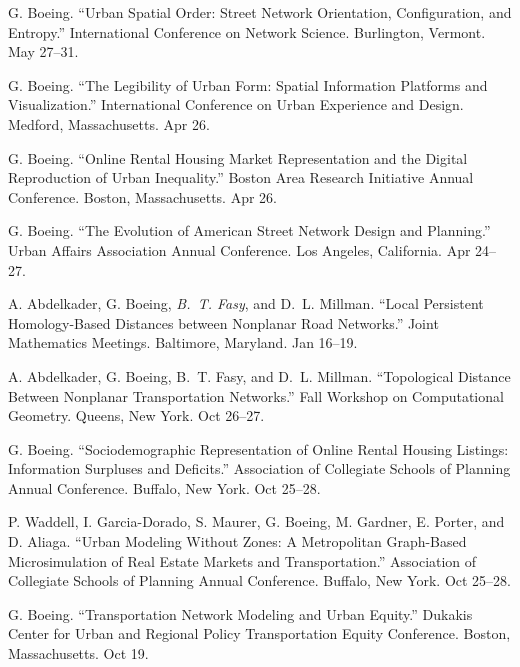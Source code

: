 \documentclass[11pt,letterpaper]{report} %
\begin{document}
\begin{tablist}
\item[2019] \tab{}G. Boeing. \enquote{Urban Spatial Order: Street Network Orientation, Configuration, and Entropy.} International Conference on Network Science. Burlington, Vermont. May 27--31.

\item[2019] \tab{}G. Boeing. \enquote{The Legibility of Urban Form: Spatial Information Platforms and Visualization.} International Conference on Urban Experience and Design. Medford, Massachusetts. Apr 26.

\item[2019] \tab{}G. Boeing. \enquote{Online Rental Housing Market Representation and the Digital Reproduction of Urban Inequality.} Boston Area Research Initiative Annual Conference. Boston, Massachusetts. Apr 26.

\item[2019] \tab{}G. Boeing. \enquote{The Evolution of American Street Network Design and Planning.} Urban Affairs Association Annual Conference. Los Angeles, California. Apr 24--27.

\item[2019] \tab{}A. Abdelkader, G. Boeing, \textit{B.~T. Fasy}, and D.~L. Millman. \enquote{Local Persistent Homology-Based Distances between Nonplanar Road Networks.} Joint Mathematics Meetings. Baltimore, Maryland. Jan 16--19.

\item[2018] \tab{}A. Abdelkader, G. Boeing, B.~T. Fasy, and D.~L. Millman. \enquote{Topological Distance Between Nonplanar Transportation Networks.} Fall Workshop on Computational Geometry. Queens, New York. Oct 26--27.

\item[2018] \tab{}G. Boeing. \enquote{Sociodemographic Representation of Online Rental Housing Listings: Information Surpluses and Deficits.} Association of Collegiate Schools of Planning Annual Conference. Buffalo, New York. Oct 25--28.

\item[2018] \tab{}P. Waddell, I. Garcia-Dorado, S. Maurer, G. Boeing, M. Gardner, E. Porter, and D. Aliaga. \enquote{Urban Modeling Without Zones: A Metropolitan Graph-Based Microsimulation of Real Estate Markets and Transportation.} Association of Collegiate Schools of Planning Annual Conference. Buffalo, New York. Oct 25--28.

\item[2018] \tab{}G. Boeing. \enquote{Transportation Network Modeling and Urban Equity.} Dukakis Center for Urban and Regional Policy Transportation Equity Conference. Boston, Massachusetts. Oct 19.


\end{tablist}
\end{document}
